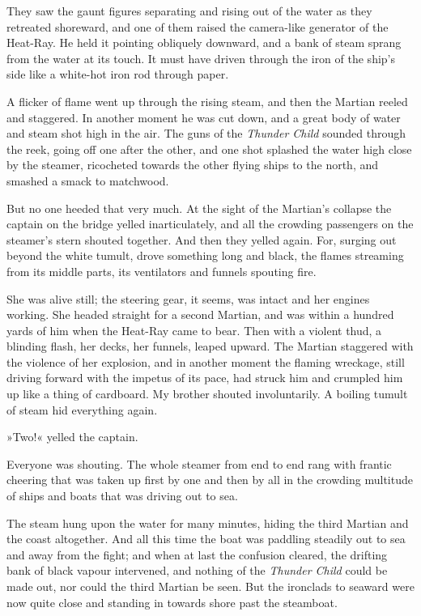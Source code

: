 They saw the gaunt figures separating and rising out of the water as they retreated shoreward, and one of them raised the camera-like generator of the Heat-Ray. He held it pointing obliquely downward, and a bank of steam sprang from the water at its touch. It must have driven through the iron of the ship's side like a white-hot iron rod through paper.

A flicker of flame went up through the rising steam, and then the Martian reeled and staggered. In another moment he was cut down, and a great body of water and steam shot high in the air. The guns of the \textit{Thunder Child} sounded through the reek, going off one after the other, and one shot splashed the water high close by the steamer, ricocheted towards the other flying ships to the north, and smashed a smack to matchwood.

But no one heeded that very much. At the sight of the Martian's collapse the captain on the bridge yelled inarticulately, and all the crowding passengers on the steamer's stern shouted together. And then they yelled again. For, surging out beyond the white tumult, drove something long and black, the flames streaming from its middle parts, its ventilators and funnels spouting fire.

She was alive still; the steering gear, it seems, was intact and her engines working. She headed straight for a second Martian, and was within a hundred yards of him when the Heat-Ray came to bear. Then with a violent thud, a blinding flash, her decks, her funnels, leaped upward. The Martian staggered with the violence of her explosion, and in another moment the flaming wreckage, still driving forward with the impetus of its pace, had struck him and crumpled him up like a thing of cardboard. My brother shouted involuntarily. A boiling tumult of steam hid everything again.

»Two!« yelled the captain.

Everyone was shouting. The whole steamer from end to end rang with frantic cheering that was taken up first by one and then by all in the crowding multitude of ships and boats that was driving out to sea.

The steam hung upon the water for many minutes, hiding the third Martian and the coast altogether. And all this time the boat was paddling steadily out to sea and away from the fight; and when at last the confusion cleared, the drifting bank of black vapour intervened, and nothing of the \textit{Thunder Child} could be made out, nor could the third Martian be seen. But the ironclads to seaward were now quite close and standing in towards shore past the steamboat.




